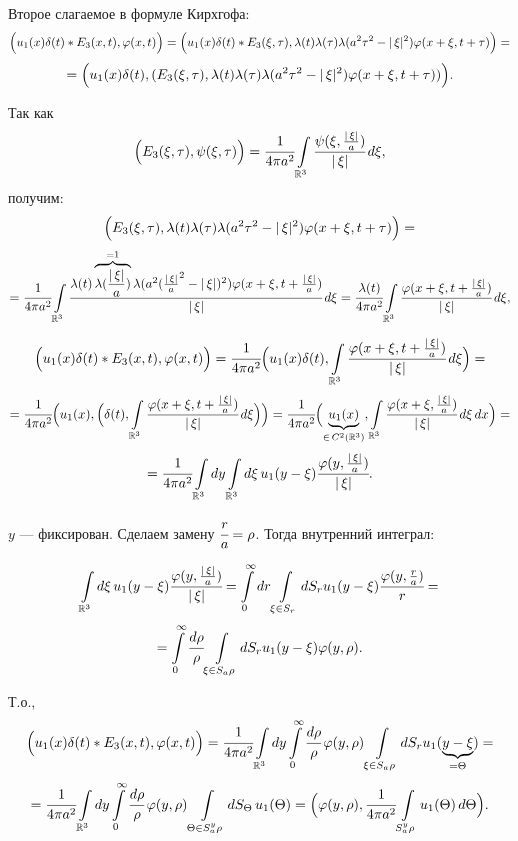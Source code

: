 \documentclass[12pt,a4paper,draft]{article}
\DeclareRobustCommand*{\т}{~--- }
\DeclareRobustCommand*{\ч}{~-- }
\begin{document}
Второе слагаемое в формуле Кирхгофа:
$$\Bigl(u_1(x)\delta(t)*E_3(x,t),\varphi(x,t)\Bigr)=
\Bigl(u_1(x)\delta(t)*E_3(\xi,\tau),
\lambda(t)\lambda(\tau)\lambda(a^2\tau^2-|\,\xi|^2)\varphi(x+\xi,t+\tau)\Bigr)=$$
$$=\Bigl(u_1(x)\delta(t),
(E_3(\xi,\tau),\lambda(t)\lambda(\tau)\lambda(a^2\tau^2-|\,\xi|^2)\varphi(x+\xi,t+\tau))\Bigr).$$

Так как $$\Bigl(E_3(\xi,\tau),\psi(\xi,\tau)\Bigr)= \cfrac1{4\pi
a^2}\int\limits_{\mathbb R^3}
\cfrac{\psi(\xi,\frac{|\,\xi|}a)}{|\,\xi|}\,d\xi,$$ получим:
$$\Bigl(E_3(\xi,\tau),\lambda(t)\lambda(\tau)\lambda(a^2\tau^2-|\,\xi|^2)\varphi(x+\xi,t+\tau)\Bigr)=$$
$$=\cfrac1{4\pi a^2}\int\limits_{\mathbb R^3}
\cfrac{\lambda(t)\overbrace{\lambda(\frac{|\,\xi|}a)}^{=1}\lambda(a^2(\frac{|\,\xi|}a^2-|\,\xi|)^2)
\varphi(x+\xi,t+\frac{|\,\xi|}a)}{|\,\xi|}\,d\xi=
\cfrac{\lambda(t)} {4\pi a^2}\int\limits_{\mathbb
R^3}\cfrac{\varphi(x+\xi,t+\frac{|\,\xi|}a)}{|\,\xi|}\,d\xi,$$

$$\Bigl(u_1(x)\delta(t)*E_3(x,t),\varphi(x,t)\Bigr)=
\cfrac1{4\pi a^2}\Bigl(u_1(x)\delta(t),\int\limits_{\mathbb
R^3}\cfrac{\varphi(x+\xi,t+\frac{|\,\xi|}a)}{|\,\xi|}\,d\xi\Bigr)=$$
$$=\cfrac1{4\pi a^2}\Bigl(u_1(x),\Bigl(\delta(t),\int\limits_{\mathbb
R^3}\cfrac{\varphi(x+\xi,t+\frac{|\,\xi|}a)}{|\,\xi|}\,d\xi\Bigr)\Bigr)=
\cfrac1{4\pi a^2}\Bigl(\underbrace{u_1(x)}_{\in \,C^2(\mathbb
R^3)},\int\limits_{\mathbb
R^3}\cfrac{\varphi(x+\xi,\frac{|\,\xi|}a)}{|\,\xi|}\,d\xi\,dx\Bigr)=$$
$$=\cfrac1{4\pi a^2}\int\limits_{\mathbb
R^3}dy\int\limits_{\mathbb R^3}d\xi\,u_1(y-\xi)
\cfrac{\varphi(y,\frac{|\,\xi|}a)}{|\,\xi|}.$$

$y$ --- фиксирован. Сделаем замену $\cfrac ra=\rho$. Тогда
внутренний интеграл:

$$\int\limits_{\mathbb R^3}d\xi\,u_1(y-\xi)
\cfrac{\varphi(y,\frac{|\,\xi|}a)}{|\,\xi|}=
\int\limits_0^{\infty}dr \int\limits_{\xi\in S_r}dS_r u_1(y-\xi)
\cfrac{\varphi(y,\frac{r}a)}{r}=$$
$$=\int\limits_0^{\infty}\cfrac{d\rho}{\rho} \int\limits_{\xi\in S_a\rho}dS_r u_1(y-\xi)
\varphi(y,\rho).$$

Т.о.,
$$\Bigl(u_1(x)\delta(t)*E_3(x,t),\varphi(x,t)\Bigr)=
\cfrac1{4\pi a^2}\int\limits_{\mathbb
R^3}dy\int\limits_0^{\infty}\cfrac{d\rho}{\rho}\,\varphi(y,\rho)
\int\limits_{\xi\in S_a\rho}dS_r
u_1(\underbrace{y-\xi}_{=\Theta})=$$
$$=\cfrac1{4\pi a^2}\int\limits_{\mathbb
R^3}dy\int\limits_0^{\infty}\cfrac{d\rho}{\rho}\,\varphi(y,\rho)
\int\limits_{\Theta\in S^y_a\rho}dS_{\Theta}\,u_1(\Theta)=
\Bigl(\varphi(y,\rho),\cfrac1{4\pi
a^2}\int\limits_{S^y_a\rho}u_1(\Theta)\,d\Theta\Bigr).$$
\end{document}
